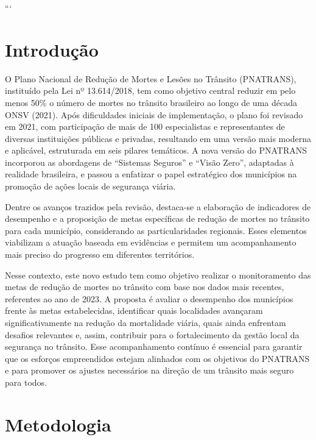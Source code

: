 \documentclass[
  letterpaper,
  DIV=11,
  numbers=noendperiod]{scrreprt}
\begin{document}
```


\chapter{Introdução}\label{introduuxe7uxe3o}

O Plano Nacional de Redução de Mortes e Lesões no Trânsito (PNATRANS),
instituído pela Lei nº 13.614/2018, tem como objetivo central reduzir em
pelo menos 50\% o número de mortes no trânsito brasileiro ao longo de
uma década ONSV (2021). Após dificuldades iniciais de implementação, o
plano foi revisado em 2021, com participação de mais de 100
especialistas e representantes de diversas instituições públicas e
privadas, resultando em uma versão mais moderna e aplicável, estruturada
em seis pilares temáticos. A nova versão do PNATRANS incorporou as
abordagens de ``Sistemas Seguros'' e ``Visão Zero'', adaptadas à
realidade brasileira, e passou a enfatizar o papel estratégico dos
municípios na promoção de ações locais de segurança viária.

Dentre os avanços trazidos pela revisão, destaca-se a elaboração de
indicadores de desempenho e a proposição de metas específicas de redução
de mortes no trânsito para cada município, considerando as
particularidades regionais. Esses elementos viabilizam a atuação baseada
em evidências e permitem um acompanhamento mais preciso do progresso em
diferentes territórios.

Nesse contexto, este novo estudo tem como objetivo realizar o
monitoramento das metas de redução de mortes no trânsito com base nos
dados mais recentes, referentes ao ano de 2023. A proposta é avaliar o
desempenho dos municípios frente às metas estabelecidas, identificar
quais localidades avançaram significativamente na redução da mortalidade
viária, quais ainda enfrentam desafios relevantes e, assim, contribuir
para o fortalecimento da gestão local da segurança no trânsito. Esse
acompanhamento contínuo é essencial para garantir que os esforços
empreendidos estejam alinhados com os objetivos do PNATRANS e para
promover os ajustes necessários na direção de um trânsito mais seguro
para todos.


\chapter{Metodologia}\label{metodologia}
\end{document}
